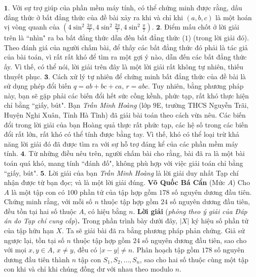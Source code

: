 \begin{multicols}{2}
	\vskip 0.05cm
	$\pmb{1.}$ Với sự trợ giúp của phần mềm máy tính, có thể chứng minh được rằng, dấu đẳng thức ở bất đẳng thức của đề bài xảy ra khi và chỉ khi $(a, b, c)$ là một hoán vị vòng quanh của  $\left( {4{{\sin }^2}\frac{{3\pi }}{7},4{{\sin }^2}\frac{{2\pi }}{7},4{{\sin }^2}\frac{\pi }{7}} \right)$.
	\vskip 0.05cm
	$\pmb{2.}$ Điểm mấu chốt ở lời giải trên là ``nhìn" ra ba bất đẳng thức dẫn đến bất đẳng thức ($1$) (trong lời giải đó). Theo đánh giá của người chấm bài, để thấy các bất đẳng thức đó phải là tác giả của bài toán, vì rất rất khó để tìm ra một gợi ý nào, dẫn đến các bất đẳng thức ấy. Vì thế, có thể nói, lời giải trên đây là một lời giải rất không tự nhiên, thiếu thuyết phục.
	\vskip 0.05cm
	$\pmb{3.}$ Cách xử lý tự nhiên để chứng minh bất đẳng thức của đề bài là sử dụng phép đổi biến $q = ab + bc + ca$, $r = abc$. Tuy nhiên, bằng phương pháp này, bạn sẽ gặp phải các biến đổi hết sức cồng kềnh, phức tạp, rất khó thực hiện chỉ bằng ``giấy, bút". Bạn \textit{Trần Minh Hoàng} (lớp $9$E, trường THCS Nguyễn Trãi, Huyện Nghi Xuân, Tỉnh Hà Tĩnh) đã giải bài toán theo cách vừa nêu. Các biến đổi trong lời giải của bạn Hoàng quả thực rất phức tạp, các hệ số trong các biến đổi rất lớn, rất khó có thể tính được bằng tay. Vì thế, khó có thể loại trừ khả năng lời giải đó đã được tìm ra với sự hỗ trợ đáng kể của các phần mềm máy tính.
	\vskip 0.05cm
	$\pmb{4.}$ Từ những điều nêu trên, người chấm bài cho rằng, bài đã ra là một bài toán quá khó, mang tính ``đánh đố", không phù hợp với việc giải toán chỉ bằng ``giấy, bút".
	\vskip 0.05cm
	$\pmb{5.}$ Lời giải của bạn \textit{Trần Minh Hoàng} là lời giải duy nhất Tạp chí nhận được từ bạn đọc; và là một lời giải đúng.
	\vskip 0.1cm
	\hfill	\textbf{\color{thachthuctoanhoc}Võ Quốc Bá Cẩn}
	\vskip 0.1cm
	{}
	(Mức $A$) Cho $A$ là một tập con có $100$ phần tử của tập hợp gồm $178$ số nguyên dương đầu tiên. Chứng minh rằng, với mỗi số $n$ thuộc tập hợp gồm $24$ số nguyên dương đầu tiên, đều tồn tại hai số thuộc $A$, có hiệu bằng $n$.
	\vskip 0.05cm
	\textbf{\color{thachthuctoanhoc}Lời giải} (\textit{phỏng theo ý giải của Đáp án do Tạp chí cung cấp})\textbf{\color{thachthuctoanhoc}.}
	\vskip 0.05cm
	Trong phần trình bày dưới đây, $|X|$  ký hiệu số phần tử của tập hữu hạn $X$.
	\vskip 0.05cm
	Ta sẽ giải bài đã ra bằng phương pháp phản chứng.
	\vskip 0.05cm
	Giả sử ngược lại, tồn tại số $n$ thuộc tập hợp gồm $24$ số nguyên dương đầu tiên, sao cho với mọi $x, y \in A$, $x \ne y$, đều có $|x - y| \ne n$.
	\vskip 0.05cm 
	Phân hoạch tập gồm $178$ số nguyên dương đầu tiên thành $n$ tập con  $S_1,  S_2, \ldots,  S_n$, sao cho hai số thuộc cùng một tập con khi và chỉ khi chúng đồng dư với nhau theo modulo $n$.

\end{multicols}
